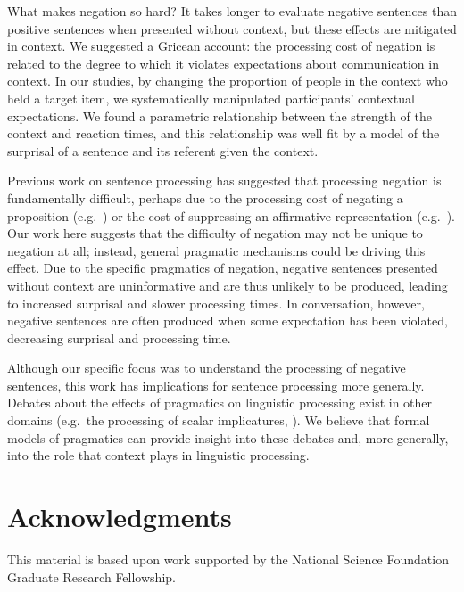 \documentclass[10pt,letterpaper]{article}
\begin{document}
What makes negation so hard? It takes longer to evaluate negative sentences than positive sentences when presented without context, but these effects are mitigated in context. We suggested a Gricean account: the processing cost of negation is related to the degree to which it violates expectations about communication in context. In our studies, by changing the proportion of people in the context who held a target item, we systematically manipulated participants' contextual expectations.  We found a parametric relationship between the strength of the context and reaction times, and this relationship was well fit by a model of the surprisal of a sentence and its referent given the context.

Previous work on sentence processing has suggested that processing negation is fundamentally difficult, perhaps due to the processing cost of negating a proposition (e.g.\ ) or the cost of suppressing an affirmative representation (e.g.\ ).  Our work here suggests that the difficulty of negation may not be unique to negation at all; instead, general pragmatic mechanisms could be driving this effect.  Due to the specific pragmatics of negation, negative sentences presented without context are uninformative and are thus unlikely to be produced, leading to increased surprisal and slower processing times.  In conversation, however, negative sentences are often produced when some expectation has been violated, decreasing surprisal and processing time.  

Although our specific focus was to understand the processing of negative sentences, this work has implications for sentence processing more generally.  Debates about the effects of pragmatics on linguistic processing exist in other domains (e.g.\ the processing of scalar implicatures, ). We believe that formal models of pragmatics can provide insight into these debates and, more generally, into the role that context plays in linguistic processing. 

\section{Acknowledgments}
This material is based upon work supported by the National Science Foundation Graduate Research Fellowship. 




\setlength{\bibleftmargin}{.125in}
\setlength{\bibindent}{-\bibleftmargin}


\end{document}
